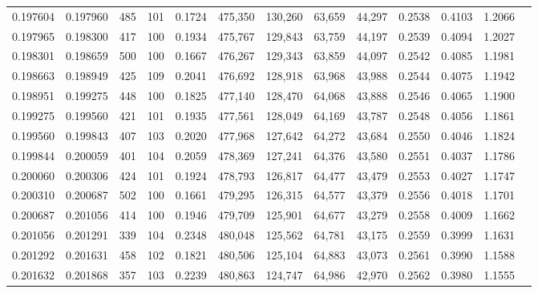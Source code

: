 \begin{tabular}{rrrrrrrrrrrrr}
0.197604 & 0.197960 &   485 & 101 &                                     0.1724 & 475,350 & 130,260 &  63,659 &  44,297 & 0.2538 & 0.4103 & 1.2066 \\
0.197965 & 0.198300 &   417 & 100 &                                     0.1934 & 475,767 & 129,843 &  63,759 &  44,197 & 0.2539 & 0.4094 & 1.2027 \\
0.198301 & 0.198659 &   500 & 100 &                                     0.1667 & 476,267 & 129,343 &  63,859 &  44,097 & 0.2542 & 0.4085 & 1.1981 \\
0.198663 & 0.198949 &   425 & 109 &                                     0.2041 & 476,692 & 128,918 &  63,968 &  43,988 & 0.2544 & 0.4075 & 1.1942 \\
0.198951 & 0.199275 &   448 & 100 &                                     0.1825 & 477,140 & 128,470 &  64,068 &  43,888 & 0.2546 & 0.4065 & 1.1900 \\
0.199275 & 0.199560 &   421 & 101 &                                     0.1935 & 477,561 & 128,049 &  64,169 &  43,787 & 0.2548 & 0.4056 & 1.1861 \\
0.199560 & 0.199843 &   407 & 103 &                                     0.2020 & 477,968 & 127,642 &  64,272 &  43,684 & 0.2550 & 0.4046 & 1.1824 \\
0.199844 & 0.200059 &   401 & 104 &                                     0.2059 & 478,369 & 127,241 &  64,376 &  43,580 & 0.2551 & 0.4037 & 1.1786 \\
0.200060 & 0.200306 &   424 & 101 &                                     0.1924 & 478,793 & 126,817 &  64,477 &  43,479 & 0.2553 & 0.4027 & 1.1747 \\
0.200310 & 0.200687 &   502 & 100 &                                     0.1661 & 479,295 & 126,315 &  64,577 &  43,379 & 0.2556 & 0.4018 & 1.1701 \\
0.200687 & 0.201056 &   414 & 100 &                                     0.1946 & 479,709 & 125,901 &  64,677 &  43,279 & 0.2558 & 0.4009 & 1.1662 \\
0.201056 & 0.201291 &   339 & 104 &                                     0.2348 & 480,048 & 125,562 &  64,781 &  43,175 & 0.2559 & 0.3999 & 1.1631 \\
0.201292 & 0.201631 &   458 & 102 &                                     0.1821 & 480,506 & 125,104 &  64,883 &  43,073 & 0.2561 & 0.3990 & 1.1588 \\
0.201632 & 0.201868 &   357 & 103 &                                     0.2239 & 480,863 & 124,747 &  64,986 &  42,970 & 0.2562 & 0.3980 & 1.1555 \\

\end{tabular}
